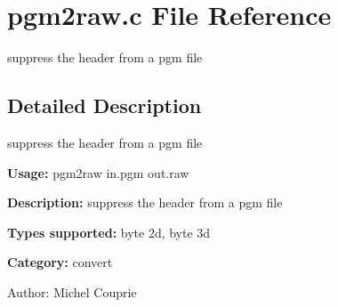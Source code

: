 \section{pgm2raw.c File Reference}
\label{pgm2raw_8c}
suppress the header from a pgm file 



\subsection{Detailed Description}
suppress the header from a pgm file 

{\bf Usage:} pgm2raw in.pgm out.raw

{\bf Description:} suppress the header from a pgm file

{\bf Types supported:} byte 2d, byte 3d

{\bf Category:} convert

\begin{Desc}
\item[Author:]Michel Couprie \end{Desc}
